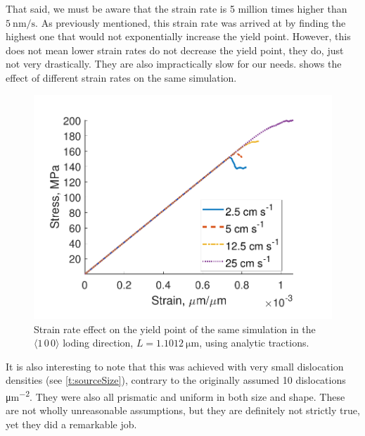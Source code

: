 That said, we must be aware that the strain rate is 5 million times higher than $\SI{5}{\nano\meter\per\second}$. As previously mentioned, this strain rate was arrived at by finding the highest one that would not exponentially increase the yield point. However, this does not mean lower strain rates do not decrease the yield point, they do, just not very drastically. They are also impractically slow for our needs.  shows the effect of different strain rates on the same simulation.

\begin{figure}
    \centering
    \includegraphics[width=0.8\linewidth]{../data/strainRate_16-Mar-2021_8_tensile_ni_100.pdf}
    \caption{Strain rate effect on the yield point of the same simulation in the $\langle 1\, 0\, 0 \rangle$ loding direction, $L = \SI{1.1012}{\micro\metre}$, using analytic tractions.}
    \label{f:strainRate}
\end{figure}

It is also interesting to note that this was achieved with very small dislocation densities (see \cref{t:sourceSize}), contrary to the originally assumed 10 dislocations \si{\micro\metre^{-2}}. They were also all prismatic and uniform in both size and shape. These are not wholly unreasonable assumptions, but they are definitely not strictly true, yet they did a remarkable job.

